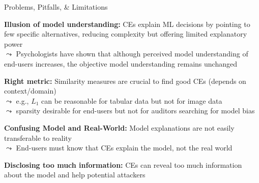 \documentclass[10pt,compress,t,notes=noshow,xcolor=table]{beamer}
\begin{document}
\begin{framei}[align=top]{Problems, Pitfalls, \& Limitations}
\item<+-> \textbf{Illusion of model understanding:} CEs explain ML decisions by pointing to few specific alternatives, reducing complexity but offering limited explanatory power\\
$\leadsto$ Psychologists have shown that although perceived model understanding of end-users increases, the objective model understanding remains unchanged
\item<+-> \textbf{Right metric:} Similarity measures are crucial to find good CEs (depends on context/domain)\\
$\leadsto$ e.g., $L_1$ can be reasonable for tabular data but not for image data\\
$\leadsto$ sparsity desirable for end-users but not for auditors searching for model bias
\item<+-> \textbf{Confusing Model and Real-World:} Model explanations are not easily transferable to reality\\
$\leadsto$ End-users must know that CEs explain the model, not the real world %
\item<+-> \textbf{Disclosing too much information:}
CEs can reveal too much information about the model and help potential attackers
\end{framei}
\end{document}
